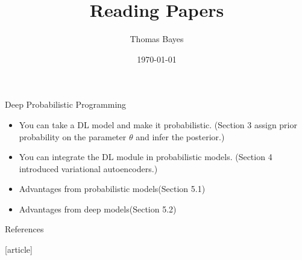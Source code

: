 \documentclass{beamer}
\title{Reading Papers}
\author{Thomas Bayes}
\institute{
\texttt{[image: ../bayes.png]}%
}
\date{\today}
\begin{document}
    
\frame{\titlepage}

\begin{frame}{Deep Probabilistic Programming\cite{tran2017deep}}
\begin{itemize}
\item You can take a DL model and make it probabilistic. (Section 3 assign prior probability on the parameter $\theta$ and infer the posterior.)
\item You can integrate the DL module in probabilistic models. (Section 4 introduced variational autoencoders.)
\item Advantages from probabilistic models(Section 5.1) 
\item Advantages from deep models(Section 5.2)
\end{itemize}
\end{frame}



\begin{frame}[allowframebreaks]{References}


[article]

\end{frame}
\end{document}
